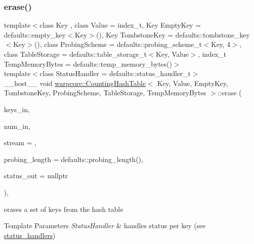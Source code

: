 \subsubsection{\texorpdfstring{erase()}{erase()}\hspace{0.1cm}{\footnotesize\ttfamily [2/2]}}
{\footnotesize\ttfamily template$<$class Key , class Value  = index\+\_\+t, Key Empty\+Key = defaults\+::empty\+\_\+key$<$\+Key$>$(), Key Tombstone\+Key = defaults\+::tombstone\+\_\+key$<$\+Key$>$(), class Probing\+Scheme  = defaults\+::probing\+\_\+scheme\+\_\+t$<$\+Key, 4$>$, class Table\+Storage  = defaults\+::table\+\_\+storage\+\_\+t$<$\+Key, Value$>$, index\+\_\+t Temp\+Memory\+Bytes = defaults\+::temp\+\_\+memory\+\_\+bytes()$>$ \\
template$<$class Status\+Handler  = defaults\+::status\+\_\+handler\+\_\+t$>$ \\
\+\_\+\+\_\+host\+\_\+\+\_\+ void \hyperlink{classwarpcore_1_1CountingHashTable}{warpcore\+::\+Counting\+Hash\+Table}$<$ Key, Value, Empty\+Key, Tombstone\+Key, Probing\+Scheme, Table\+Storage, Temp\+Memory\+Bytes $>$\+::erase (\begin{DoxyParamCaption}\item[{key\+\_\+type $\ast$}]{keys\+\_\+in,  }\item[{index\+\_\+type}]{num\+\_\+in,  }\item[{cuda\+Stream\+\_\+t}]{stream = {},  }\item[{index\+\_\+type}]{probing\+\_\+length = {\ttfamily defaults\+:\+:probing\+\_\+length()},  }\item[{typename Status\+Handler\+::base\+\_\+type $\ast$}]{status\+\_\+out = {\ttfamily nullptr} }\end{DoxyParamCaption})\hspace{0.3cm}{\ttfamily [inline]}, {\ttfamily [noexcept]}}



erases a set of keys from the hash table 


\begin{DoxyTemplParams}{Template Parameters}
{\em Status\+Handler} & handles status per key (see {\ttfamily \hyperlink{namespacewarpcore_1_1status__handlers}{status\+\_\+handlers}}) \\
\hline
\end{DoxyTemplParams}

